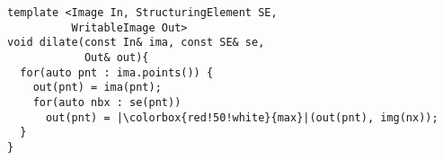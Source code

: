 \documentclass[varwidth=8cm, border={0.1cm 0.1cm 0.1cm 0.1cm}]{standalone}
\begin{document}
\begin{verbatim}
template <Image In, StructuringElement SE,
          WritableImage Out>
void dilate(const In& ima, const SE& se,
            Out& out){
  for(auto pnt : ima.points()) {
    out(pnt) = ima(pnt);
    for(auto nbx : se(pnt))
      out(pnt) = |\colorbox{red!50!white}{max}|(out(pnt), img(nx));
  }
}
\end{verbatim}
\end{document}
